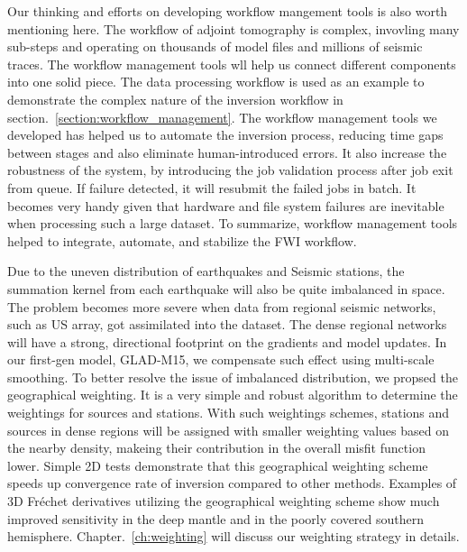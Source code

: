 Our thinking and efforts on developing workflow mangement tools is also worth mentioning here.
The workflow of adjoint tomography is complex, invovling many sub-steps and operating
on thousands of model files and millions of seismic traces.
The workflow management tools wll help us connect different components into one solid
piece.
The data processing workflow is used as an example to demonstrate the complex
nature of the inversion workflow
in section.~\ref{section:workflow_management}. The workflow management tools we developed
has helped us to automate the inversion process, reducing time gaps between stages and
also eliminate human-introduced errors.
It also increase the robustness of the system, by introducing
the job validation process after job exit from queue.
If failure detected, it will resubmit the failed  jobs in batch.
It becomes very handy given that
hardware and file system failures are inevitable when processing such a large dataset.
To summarize, workflow management tools helped to integrate, automate, and stabilize
the FWI workflow.

Due to the uneven distribution of earthquakes and Seismic stations, the summation
kernel from each earthquake will also be quite imbalanced in space.
The problem becomes more severe when data from regional seismic networks, such as US array,
got assimilated into the dataset.
The dense regional networks will have a strong, directional footprint on the gradients and
model updates.
In our first-gen model, GLAD-M15, we compensate such effect using multi-scale smoothing.
To better resolve the issue of imbalanced distribution, we propsed the geographical weighting.
It is a very simple and robust algorithm to determine the weightings for sources and stations.
With such weightings schemes, stations and sources
in dense regions will be assigned with smaller weighting
values based on the nearby density, makeing their contribution in the overall misfit function
lower.
Simple 2D tests demonstrate that this geographical weighting scheme speeds up
convergence rate of inversion compared to other methods.
Examples of 3D Fr\'echet derivatives utilizing the geographical weighting scheme show
much improved sensitivity in the deep mantle and in the poorly covered southern hemisphere.
Chapter.~\ref{ch:weighting} will discuss our weighting strategy in details.

